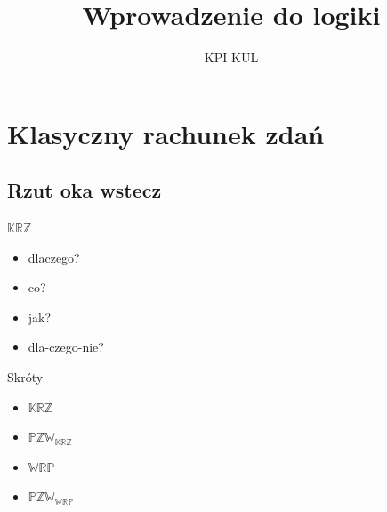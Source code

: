 \documentclass{beamer}
\title{Wprowadzenie do logiki}
\author{KPI KUL}
\institute{\url{ai.kul.pl}}
\newcommand {\KRZ} {\ensuremath{\mathbb{KRZ}}}
\newcommand {\PZWKRZ} {\ensuremath{\mathbb{PZW_{KRZ}}}}
\newcommand {\PZWWRP} {\ensuremath{\mathbb{PZW_{WRP}}}}
\newcommand {\WRP} {\ensuremath{\mathbb{WRP}}}
\begin{document}
\frame{\titlepage}






\section{Klasyczny rachunek zdań}

\subsection{Rzut oka wstecz}

\begin{frame}{\KRZ}
%
    \begin{itemize}
        \item dlaczego?
        \item co?
        \item jak?
        \item dla-czego-nie?
    \end{itemize}
\end{frame}

\begin{frame}{Skróty}
\begin{itemize}
\item \KRZ
\item \PZWKRZ
\item \WRP
\item \PZWWRP
\end{itemize}
\end{frame}
\end{document}
